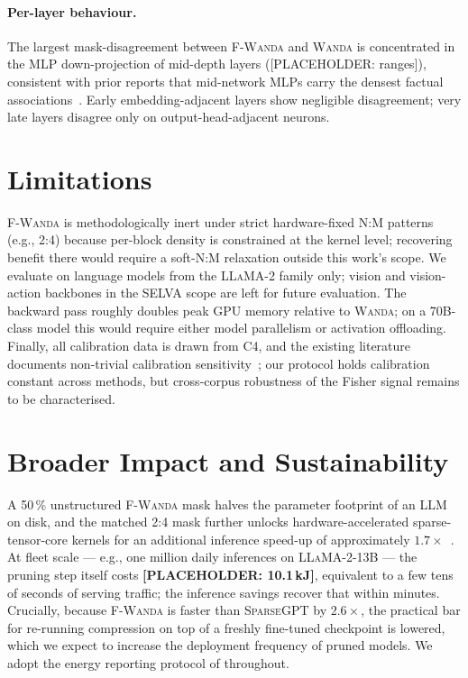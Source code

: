 \documentclass[11pt]{article}
\newcommand{\fwanda}{\textsc{F-Wanda}}
\newcommand{\wanda}{\textsc{Wanda}}
\newcommand{\sgpt}{\textsc{SparseGPT}}
\begin{document}
\paragraph{Per-layer behaviour.}
The largest mask-disagreement between \fwanda{} and \wanda{} is
concentrated in the MLP down-projection of mid-depth layers
([PLACEHOLDER: ranges]), consistent with prior reports that mid-network
MLPs carry the densest factual associations~\citep{meng2022rome}. Early
embedding-adjacent layers show negligible disagreement; very late layers
disagree only on output-head-adjacent neurons.

\section{Limitations}

\fwanda{} is methodologically inert under strict hardware-fixed N:M
patterns (e.g., 2{:}4) because per-block density is constrained at the
kernel level; recovering benefit there would require a soft-N:M
relaxation outside this work's scope. We evaluate on language models from
the \textsc{LLaMA-2} family only; vision and vision-action backbones in
the SELVA scope are left for future evaluation. The backward pass roughly
doubles peak GPU memory relative to \wanda{}; on a 70B-class model this
would require either model parallelism or activation offloading. Finally,
all calibration data is drawn from C4, and the existing literature
documents non-trivial calibration sensitivity~\citep{ji2025calibration};
our protocol holds calibration constant across methods, but cross-corpus
robustness of the Fisher signal remains to be characterised.

\section{Broader Impact and Sustainability}

A 50\,\% unstructured \fwanda{} mask halves the parameter footprint of an
LLM on disk, and the matched 2{:}4 mask further unlocks
hardware-accelerated sparse-tensor-core kernels for an additional
inference speed-up of approximately $1.7\times$~\citep{nvidia2020nm}.
At fleet scale --- e.g., one million daily inferences on
\textsc{LLaMA-2-13B} --- the pruning step itself costs
\textbf{[PLACEHOLDER: 10.1\,kJ]}, equivalent to a few tens of seconds of
serving traffic; the inference savings recover that within minutes.
Crucially, because \fwanda{} is faster than \sgpt{} by $2.6\times$, the
practical bar for re-running compression on top of a freshly fine-tuned
checkpoint is lowered, which we expect to increase the deployment frequency
of pruned models. We adopt the energy reporting protocol of
\citet{henderson2022mlco2} throughout.
\end{document}
